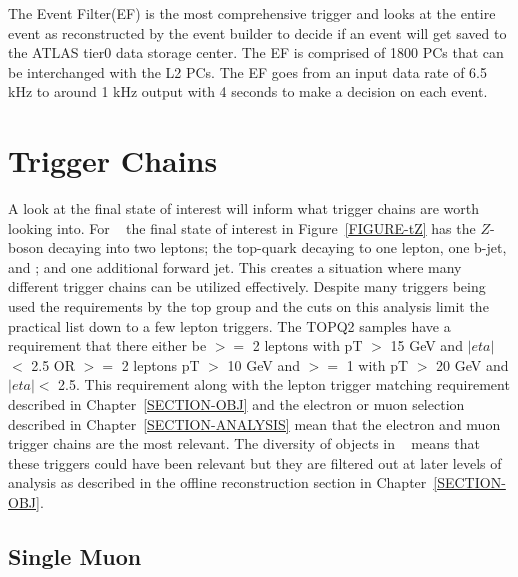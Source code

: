 The Event Filter(EF) is the most comprehensive trigger and looks at the entire event as reconstructed by the event builder to decide if an event will get saved to the ATLAS tier0 data storage center. The EF is comprised of 1800 PCs that can be interchanged with the L2 PCs. The EF goes from an input data rate of 6.5 kHz to around 1 kHz output with 4 seconds to make a decision on each event.


\section{Trigger Chains}
\label{SECTION-TRIG-CHAIN}
 A look at the final state of interest will inform what trigger chains are worth looking into. For \tz~ the final state of interest in Figure~\ref{FIGURE-tZ} has the $Z$-boson decaying into two leptons; the top-quark decaying to one lepton, one b-jet, and \MET; and one additional forward jet. This creates a situation where many different trigger chains can be utilized effectively. Despite many triggers being used the requirements by the top group and the cuts on this analysis limit the practical list down to a few lepton triggers. The TOPQ2 samples have a requirement that there either be $>=$ 2 leptons with pT $>$ 15 GeV and $|eta|$ $<$ 2.5 OR $>=$ 2 leptons pT $>$ 10 GeV and $>=$ 1 with pT $>$ 20 GeV and $|eta| <$ 2.5. This requirement along with the lepton trigger matching requirement described in Chapter~\ref{SECTION-OBJ} and the electron or muon selection described in Chapter~\ref{SECTION-ANALYSIS} mean that the electron and muon trigger chains are the most relevant. The diversity of objects in \tz~ means that these triggers could have been relevant but they are filtered out at later levels of analysis as described in the offline reconstruction section in Chapter~\ref{SECTION-OBJ}. 


\subsection{Single Muon}
\label{SECTION-TRIGGERS-1mu}

